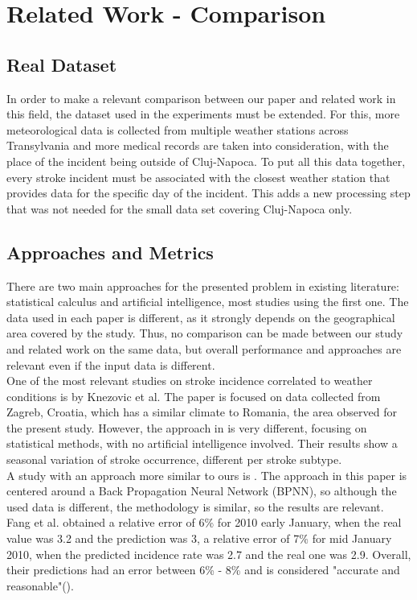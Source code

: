 \documentclass{article}
\begin{document}
\newpage
\section{Related Work - Comparison}

\subsection{Real Dataset}

In order to make a relevant comparison between our paper and related work in this field, the dataset used in the experiments must be extended. For this, more meteorological data is collected from multiple weather stations across Transylvania and more medical records are taken into consideration, with the place of the incident being outside of Cluj-Napoca. To put all this data together, every stroke incident must be associated with the closest weather station that provides data for the specific day of the incident. This adds a new processing step that was not needed for the small data set covering Cluj-Napoca only. 

\subsection{Approaches and Metrics}

There are two main approaches for the presented problem in existing literature: statistical calculus and artificial intelligence, most studies using the first one. The data used in each paper is different, as it strongly depends on the geographical area covered by the study. Thus, no comparison can be made between our study and related work on the same data, but overall performance and approaches are relevant even if the input data is different. 
\\

One of the most relevant studies on stroke incidence correlated to weather conditions is by Knezovic et al. The paper is focused on data collected from Zagreb, Croatia, which has a similar climate to Romania, the area observed for the present study. However, the approach in \cite{Knezovic:2018dg} is very different, focusing on statistical methods, with no artificial intelligence involved. Their results show a seasonal variation of stroke occurrence, different per stroke subtype. 
\\

A study with an approach more similar to ours is \cite{Fang:2014dg}. The approach in this paper is centered around a Back Propagation Neural Network (BPNN), so although the used data is different, the methodology is similar, so the results are relevant. Fang et al. obtained a relative error of 6\% for 2010 early January, when the real value was 3.2 and the prediction was 3, a relative error of 7\% for mid January 2010, when the predicted incidence rate was 2.7 and the real one was 2.9. Overall, their predictions had an error between 6\% - 8\% and is considered "accurate and reasonable"(\cite{Fang:2014dg}).
\\
\end{document}
